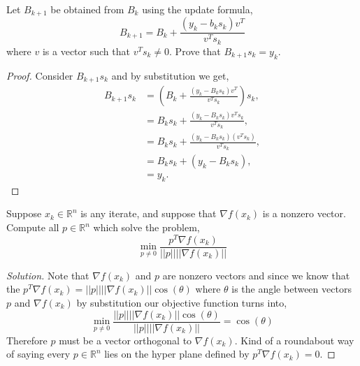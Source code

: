 \documentclass[12pt]{article}
\makeatletter
\theoremstyle{homework}
\newenvironment{exercise}[1]
{\def\@currentlabel{#1}\exercisecore}
{\endexercisecore}
\newcommand{\Reals}{\ensuremath{\mathbb R}}
\let\RR\Reals
\makeatother
\begin{document}
\begin{exercise}{3.7} Let $B_{k + 1}$ be obtained from $B_k$ using the update formula, 
  \begin{equation*}
    B_{k + 1} = B_k + \frac{(y_k - b_ks_k)v^T}{v^Ts_k}
  \end{equation*}
  where $v$ is a vector such that $v^Ts_k \neq 0$. Prove that $B_{k + 1}s_k = y_k$. 
  \begin{proof} Consider $B_{k + 1}s_k$ and by substitution we get, 
    \begin{align*}
      B_{k + 1}s_k &= \left(B_k + \frac{(y_k - B_ks_k)v^T}{v^Ts_k}\right)s_k,\\
     &= B_k s_k + \frac{(y_k - B_ks_k)v^Ts_k}{v^Ts_k},\\
     &= B_k s_k + \frac{(y_k - B_ks_k)(v^Ts_k)}{v^Ts_k},\\
     &= B_k s_k + (y_k - B_ks_k),\\
     &= y_k.
    \end{align*}
    
  \end{proof}
\end{exercise}
\vspace{.5in}


\begin{exercise}{P16} Suppose $x_k \in \RR^n$ is any iterate, and suppose that $\nabla f(x_k)$ is a nonzero vector. Compute all $p\in \RR^n$
  which solve the problem, 
  \begin{equation*}
    \min_{p \neq 0} \frac{p^T \nabla f(x_k)}{||p|| ||\nabla f(x_k)||}
  \end{equation*}
  \begin{proof}[Solution] Note that $\nabla f(x_k)$ and $p$ are nonzero vectors and since we know that the $p^T \nabla f(x_k) = ||p||||\nabla f(x_k)|| \cos(\theta)$
    where $\theta$ is the angle between vectors $p$ and $\nabla f(x_k)$ by substitution our objective function turns into, 
    \begin{equation*}
      \min_{p \neq 0} \frac{||p||||\nabla f(x_k)|| \cos(\theta)}{||p|| ||\nabla f(x_k)||} = \cos(\theta)
    \end{equation*}
    Therefore $p$ must be a vector orthogonal to $\nabla f(x_k)$. Kind of a roundabout way of saying every $p\in \RR^n$ lies on the hyper plane defined by $p^T \nabla f(x_k) = 0$. 
  \end{proof}
\end{exercise}
\vspace{.5in}
\end{document}
